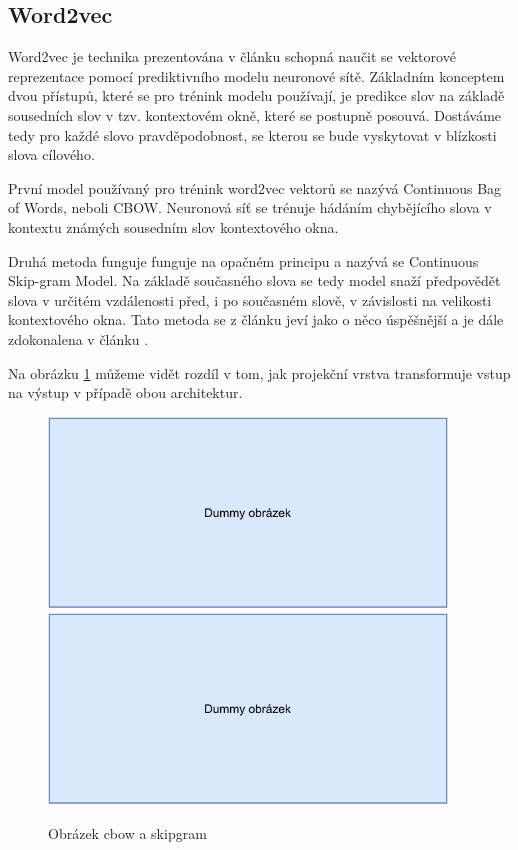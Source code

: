 \subsection{Word2vec}

Word2vec je technika prezentována v článku \cite{mikolov2013embeddings} schopná naučit se vektorové reprezentace pomocí prediktivního modelu neuronové sítě. Základním konceptem dvou přístupů, které se pro trénink modelu používají, je predikce slov na základě sousedních slov v tzv. kontextovém okně, které se postupně posouvá. Dostáváme tedy pro každé slovo pravděpodobnost, se kterou se bude vyskytovat v blízkosti slova cílového.\par
První model používaný pro trénink word2vec vektorů se nazývá Continuous Bag of Words, neboli CBOW. Neuronová síť se trénuje hádáním chybějícího slova v kontextu známých sousedním slov kontextového okna.\par
Druhá metoda funguje funguje na opačném principu a nazývá se Continuous Skip-gram Model. Na základě současného slova se tedy model snaží předpovědět slova v určitém vzdálenosti před, i po současném slově, v závislosti na velikosti kontextového okna. Tato metoda se z článku \cite{mikolov2013embeddings} jeví jako o něco úspěšnější a je dále zdokonalena v článku \cite{mikolov2013_2}.\par
Na obrázku \ref{cbow_and_skipgram} můžeme vidět rozdíl v tom, jak projekční vrstva transformuje vstup na výstup v případě obou architektur.

\begin{figure}[hbt]
	\centering
	\includegraphics[width=0.45\linewidth, height=2in]{obrazky/dummy_pic.pdf}\hfill
	\includegraphics[width=0.45\linewidth, height=2in]{obrazky/dummy_pic.pdf}
	\caption{Obrázek cbow a skipgram}
	\label{cbow_and_skipgram}
\end{figure}


